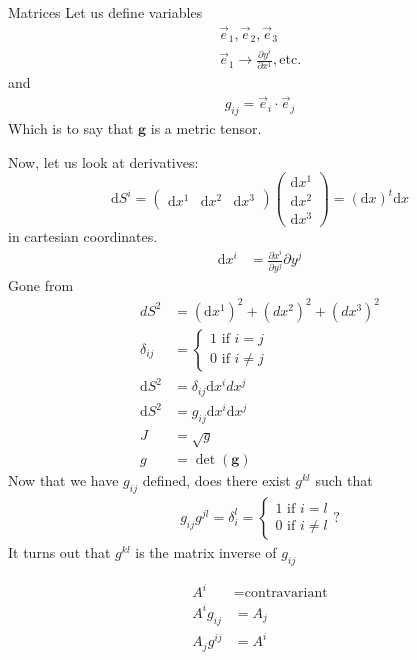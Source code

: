 \documentclass{article}
\renewcommand{\d}[0]{\mathrm{d}}
\newcommand{\pOne}[2]{\frac{\partial #1}{\partial #2}}
\newcommand{\matr}[1]{\bm{#1}}
\begin{document}
	  \begin{section}{Matrices}
	    \newcommand{\eOne}[0]{\vec{e}_1}
	    \newcommand{\eTwo}[0]{\vec{e}_2}
	    \newcommand{\eThree}[0]{\vec{e}_3}
	    \newcommand{\ei}[0]{\vec{e}_i}
	    \newcommand{\ej}[0]{\vec{e}_j}
			Let us define variables
			\begin{align*}
			\vec{e}_1, \vec{e}_2, \vec{e}_3\\
			\eOne \rightarrow \pOne{y^i}{x^1}, \text{etc.}
			\end{align*}
			and 
			\begin{align*}
				g_{ij} = \ei\cdot \ej
			\end{align*}
			Which is to say that $\matr{g}$ is a metric tensor.

			Now, let us look at derivatives:
	$$\d S^i = \begin{pmatrix}\d x^1 & \d x^2 & \d x^3\end{pmatrix}\begin{pmatrix}\d x^1 \\ \d x^2 \\ \d x^3\end{pmatrix} = (\d x)^t \d x$$
	in cartesian coordinates.  
	\begin{align*}
		\d x^i &= \pOne{x^i}{y^j} \partial y^j
	\end{align*}
	Gone from \begin{align*}
	    dS^2 &= (\d x^1)^2 + (dx^2)^2 + (dx^3)^2\\
			\delta_{ij} &= \begin{cases}1 \text{ if } i=j\\
																 0 \text{ if } i\neq j\end{cases}\\
	  \d S^2 &= \delta_{ij}\d x^i dx^j\\
	  \d S^2 &= g_{ij}\d x^i \d x^j\\
	  J &= \sqrt{g}\\
		g &= \det{(\matr{g})}
	\end{align*}
	Now that we have $g_{ij}$ defined, does there exist $g^{kl}$ such that 
	\begin{align*}
		g_{ij}g^{jl} = \delta_i^l = \begin{cases}1\text{ if }i=l\\ 0\text{ if }i\neq l\end{cases}?
	\end{align*}
	 It turns out that $g^{kl}$ is the matrix inverse of $g_{ij}$

	 \begin{align*}
		 A^i &= \text{contravariant}\\
		 A^ig_{ij} &= A_j\\
		 A_j g^{ij} &= A^i
	 \end{align*}


\end{section}
\end{document}
